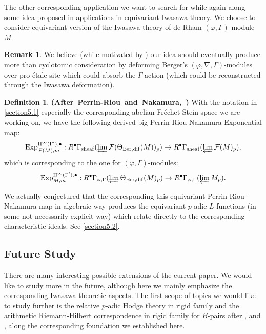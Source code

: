 \documentclass[12pt]{amsart}
\theoremstyle{definition}
\newtheorem{definition}[theorem]{Definition}
\newtheorem{remark}[theorem]{Remark}
\numberwithin{equation}{section}
\begin{document}
\indent The other corresponding application we want to search for while again along some idea proposed in \cite{KP} applications in equivariant Iwasawa theory. We choose to consider equivariant version of the Iwasawa theory of de Rham $(\varphi,\Gamma)$-module $M$. 

\begin{remark}
We believe (while motivated by \cite{KP}) our idea should eventually produce more than cyclotomic consideration by deforming Berger's $(\varphi,\nabla,\Gamma)$-modules over pro-\'etale site which could absorb the $\Gamma$-action (which could be reconstructed through the Iwasawa deformation).
\end{remark}

\begin{definition} \mbox{\bf{(After Perrin-Riou and Nakamura, \cite[Definition 3.7]{Nakamura1})}} 
With the notation in \cref{section5.1} especially the corresponding abelian Fr\'echet-Stein space we are working on, we have the following derived big Perrin-Riou-Nakamura Exponential map:
\begin{displaymath}
\mathrm{Exp}^{\Pi^\infty(\Gamma'),\bullet}_{\mathcal{F}(M),m}: R^\bullet\Gamma_\mathrm{sheaf}(\varprojlim\mathcal{F}(\Theta_{\mathrm{Ber,dif}}(M))_p) \rightarrow R^\bullet\Gamma_\mathrm{sheaf}(\varprojlim\mathcal{F}(M)_p),
\end{displaymath}
which is corresponding to the one for $(\varphi,\Gamma)$-modules:
\begin{displaymath}
\mathrm{Exp}^{\Pi^\infty(\Gamma'),\bullet}_{M,m}: R^\bullet\Gamma_{\varphi,\Gamma}(\varprojlim \Theta_{\mathrm{Ber,dif}}(M)_p) \rightarrow R^\bullet\Gamma_{\varphi,\Gamma}(\varprojlim M_p).
\end{displaymath}
\end{definition}


\indent We actually conjectured that the corresponding this equivariant Perrin-Riou-Nakamura map in algebraic way produces the equivariant $p$-adic $L$-functions (in some not necessarily explicit way)  which relate directly to the corresponding characteristic ideals. See \cref{section5.2}.\\



\subsection{Future Study}

There are many interesting possible extensions of the current paper. We would like to study more in the future, although here we mainly emphasize the corresponding Iwasawa theoretic aspects. The first scope of topics we would like to study further is the relative $p$-adic Hodge theory in rigid family and the arithmetic Riemann-Hilbert correspondence in rigid family for $B$-pairs after \cite{LZ}, \cite{TT} and \cite{Shi}, along the corresponding foundation we established here.\\
\end{document}
